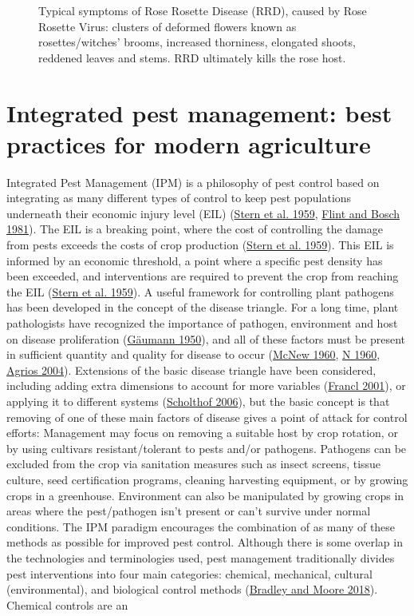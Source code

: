 \documentclass[12pt,final,CPage]{ufthesis}
\begin{document}
{\begin{figure}
{  }

  \caption{Typical symptoms of Rose Rosette Disease (RRD), caused by Rose Rosette Virus: clusters of deformed flowers known as rosettes/witches' brooms, increased thorniness, elongated shoots, reddened leaves and stems. RRD ultimately kills the rose host.}\label{fig:rrd-symptoms}
  \end{figure}
  \hypertarget{litrev-ipm}{%
  \section{Integrated pest management: best practices for modern agriculture}\label{litrev-ipm}}

  Integrated Pest Management (IPM) is a philosophy of pest control based on integrating as many different types of control to keep pest populations underneath their economic injury level (EIL) (\protect\hyperlink{ref-Stern1959}{Stern et al. 1959}, \protect\hyperlink{ref-Flint1981}{Flint and Bosch 1981}). The EIL is a breaking point, where the cost of controlling the damage from pests exceeds the costs of crop production (\protect\hyperlink{ref-Stern1959}{Stern et al. 1959}). This EIL is informed by an economic threshold, a point where a specific pest density has been exceeded, and interventions are required to prevent the crop from reaching the EIL (\protect\hyperlink{ref-Stern1959}{Stern et al. 1959}). A useful framework for controlling plant pathogens has been developed in the concept of the disease triangle. For a long time, plant pathologists have recognized the importance of pathogen, environment and host on disease proliferation (\protect\hyperlink{ref-Gaeumann1950}{Gäumann 1950}), and all of these factors must be present in sufficient quantity and quality for disease to occur (\protect\hyperlink{ref-McNew1960}{McNew 1960}, \protect\hyperlink{ref-Stevens1960}{N 1960}, \protect\hyperlink{ref-Agrios2004}{Agrios 2004}). Extensions of the basic disease triangle have been considered, including adding extra dimensions to account for more variables (\protect\hyperlink{ref-Francl2001}{Francl 2001}), or applying it to different systems (\protect\hyperlink{ref-Scholthof2006}{Scholthof 2006}), but the basic concept is that removing of one of these main factors of disease gives a point of attack for control efforts: Management may focus on removing a suitable host by crop rotation, or by using cultivars resistant/tolerant to pests and/or pathogens. Pathogens can be excluded from the crop via sanitation measures such as insect screens, tissue culture, seed certification programs, cleaning harvesting equipment, or by growing crops in a greenhouse. Environment can also be manipulated by growing crops in areas where the pest/pathogen isn't present or can't survive under normal conditions. The IPM paradigm encourages the combination of as many of these methods as possible for improved pest control. Although there is some overlap in the technologies and terminologies used, pest management traditionally divides pest interventions into four main categories: chemical, mechanical, cultural (environmental), and biological control methods (\protect\hyperlink{ref-Bradley2018}{Bradley and Moore 2018}). Chemical controls are an }
\end{document}
